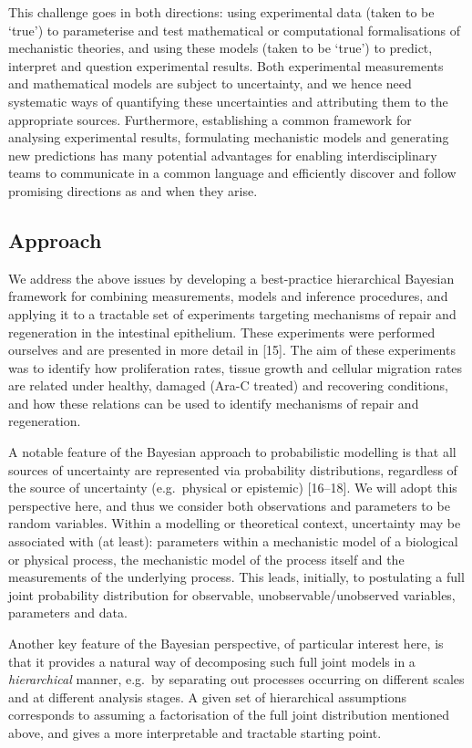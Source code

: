 \documentclass[10pt,letterpaper]{article}
\begin{document}
This challenge goes in both directions: using experimental data (taken
to be `true') to parameterise and test mathematical or computational
formalisations of mechanistic theories, and using these models (taken to
be `true') to predict, interpret and question experimental results. Both
experimental measurements and mathematical models are subject to
uncertainty, and we hence need systematic ways of quantifying these
uncertainties and attributing them to the appropriate sources.
Furthermore, establishing a common framework for analysing experimental
results, formulating mechanistic models and generating new predictions
has many potential advantages for enabling interdisciplinary teams to
communicate in a common language and efficiently discover and follow
promising directions as and when they arise.

\subsection{Approach}\label{approach}

We address the above issues by developing a best-practice hierarchical
Bayesian framework for combining measurements, models and inference
procedures, and applying it to a tractable set of experiments targeting
mechanisms of repair and regeneration in the intestinal epithelium.
These experiments were performed ourselves and are presented in more
detail in {[}15{]}. The aim of these experiments was to identify how
proliferation rates, tissue growth and cellular migration rates are
related under healthy, damaged (Ara-C treated) and recovering
conditions, and how these relations can be used to identify mechanisms
of repair and regeneration.

A notable feature of the Bayesian approach to probabilistic modelling is
that all sources of uncertainty are represented via probability
distributions, regardless of the source of uncertainty (e.g.~physical or
epistemic) {[}16--18{]}. We will adopt this perspective here, and thus
we consider both observations and parameters to be random variables.
Within a modelling or theoretical context, uncertainty may be associated
with (at least): parameters within a mechanistic model of a biological
or physical process, the mechanistic model of the process itself and the
measurements of the underlying process. This leads, initially, to
postulating a full joint probability distribution for observable,
unobservable/unobserved variables, parameters and data.

Another key feature of the Bayesian perspective, of particular interest
here, is that it provides a natural way of decomposing such full joint
models in a \emph{hierarchical} manner, e.g.~by separating out processes
occurring on different scales and at different analysis stages. A given
set of hierarchical assumptions corresponds to assuming a factorisation
of the full joint distribution mentioned above, and gives a more
interpretable and tractable starting point.
\end{document}

